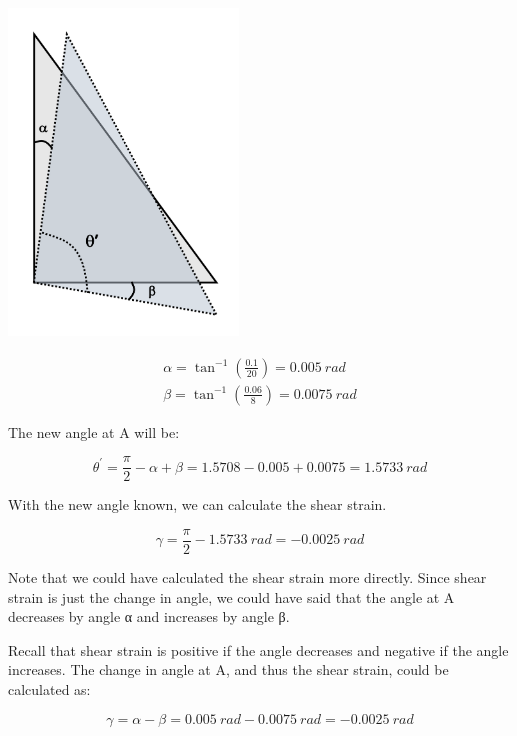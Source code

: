 \documentclass[
  letterpaper,
  DIV=11,
  numbers=noendperiod]{scrreprt}
\theoremstyle{definition}
\theoremstyle{remark}
\begin{document}
\begin{tcolorbox}
\begin{tcolorbox}
\begin{center}
\includegraphics[width=2.40625in,height=\textheight]{images/CH3 PNGs/example 3.4 part 2.png}
\end{center}

\[
\begin{gathered}
\alpha=\tan ^{-1}\left(\frac{0.1}{20}\right)=0.005{~rad} \\
\beta=\tan ^{-1}\left(\frac{0.06}{8}\right)=0.0075{~rad}
\end{gathered}
\]

The new angle at A will be:

\[
\theta^{\prime}=\frac{\pi}{2}-\alpha+\beta=1.5708-0.005+0.0075=1.5733{~rad}
\]

With the new angle known, we can calculate the shear strain.

\[
\gamma=\frac{\pi}{2}-1.5733{~rad}=-0.0025{~rad}
\]

Note that we could have calculated the shear strain more directly. Since
shear strain is just the change in angle, we could have said that the
angle at A decreases by angle α and increases by angle β.

Recall that shear strain is positive if the angle decreases and negative
if the angle increases. The change in angle at A, and thus the shear
strain, could be calculated as:

\[
\gamma=\alpha-\beta=0.005{~rad}-0.0075{~rad}=-0.0025{~rad}
\]

\end{tcolorbox}

\end{tcolorbox}
\end{document}
